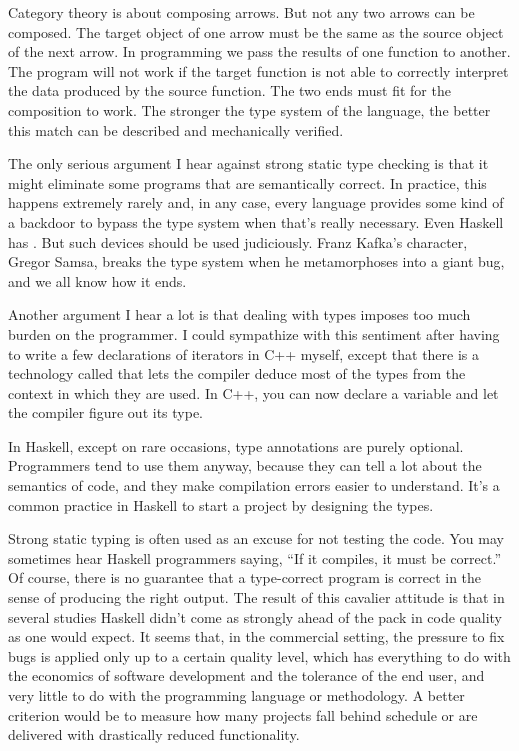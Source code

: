Category theory is about composing arrows. But not any two arrows can be
composed. The target object of one arrow must be the same as the source
object of the next arrow. In programming we pass the results of
one function to another. The program will not work if the target
function is not able to correctly interpret the data produced by the
source function. The two ends must fit for the composition to work. The
stronger the type system of the language, the better this match can be
described and mechanically verified.

The only serious argument I hear against strong static type checking is
that it might eliminate some programs that are semantically correct. In
practice, this happens extremely rarely and, in any case, every language
provides some kind of a backdoor to bypass the type system when that's
really necessary. Even Haskell has . But such
devices should be used judiciously. Franz Kafka's character, Gregor
Samsa, breaks the type system when he metamorphoses into a giant bug,
and we all know how it ends.

Another argument I hear a lot is that dealing with types imposes too
much burden on the programmer. I could sympathize with this sentiment
after having to write a few declarations of iterators in C++ myself,
except that there is a technology called  that lets
the compiler deduce most of the types from the context in which they are
used. In C++, you can now declare a variable  and let the
compiler figure out its type.

In Haskell, except on rare occasions, type annotations are purely
optional. Programmers tend to use them anyway, because they can tell a
lot about the semantics of code, and they make compilation errors easier
to understand. It's a common practice in Haskell to start a project by
designing the types. 

Strong static typing is often used as an excuse for not testing the
code. You may sometimes hear Haskell programmers saying, ``If it
compiles, it must be correct.'' Of course, there is no guarantee that a
type-correct program is correct in the sense of producing the right
output. The result of this cavalier attitude is that in several studies
Haskell didn't come as strongly ahead of the pack in code quality as one
would expect. It seems that, in the commercial setting, the pressure to
fix bugs is applied only up to a certain quality level, which has
everything to do with the economics of software development and the
tolerance of the end user, and very little to do with the programming
language or methodology. A better criterion would be to measure how many
projects fall behind schedule or are delivered with drastically reduced
functionality.


